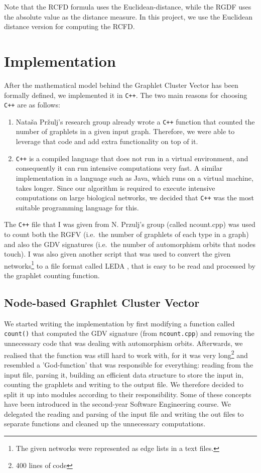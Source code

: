 Note that the RCFD formula uses the Euclidean-distance, while the RGDF uses the absolute value as the distance measure. In this project, we use the Euclidean distance version for computing the RCFD.

\section{Implementation}

After the mathematical model behind the Graphlet Cluster Vector has been formally defined, we implemented it in \verb!C++!. The two main reasons for choosing \verb!C++! are as follows:
\begin{enumerate}
 \item Nata\v{s}a Pr\v{z}ulj's research group already wrote a \verb!C++! function that counted the number of graphlets in a given input graph. Therefore, we were able to leverage that code and add extra functionality on top of it.
 \item \verb!C++! is a compiled language that does not run in a virtual
environment, and consequently it can run intensive computations very fast. A similar implementation in a language such as Java, which runs on a virtual machine, takes longer. Since our algorithm is required to execute intensive computations on large biological networks, we decided that \verb!C++! was the most suitable programming language for this.
\end{enumerate}

The \verb!C++! file that I was given from N. Przulj's group (called ncount.cpp) was used to count both the RGFV (i.e.\ the number of graphlets of each type in a graph) and also the GDV signatures (i.e.\ the number of automorphism orbits that nodes touch). I was also given another script that was used to convert the given networks\footnote{The given networks were represented as edge lists in a text files.} to a file format called LEDA \cite{leda2014fileformat}, that is easy to be read and processed by the graphlet counting function.

\subsection{Node-based Graphlet Cluster Vector}

We started writing the implementation by first modifying a function called \lstinline|count()| that computed the GDV signature (from \lstinline|ncount.cpp|) and removing the unnecessary code that was dealing with
automorphism orbits. Afterwards, we realised that the function was still hard to
work with, for it was very long\footnote{400 lines of code} and resembled a 'God-function' that was responsible for everything: reading from the input file, parsing it, building an efficient data structure to store the input in, counting the graphlets and writing to the output file. We therefore decided to split it up into modules according to their responsibility. Some of these concepts have been introduced in the
second-year Software Engineering course. We delegated the reading and parsing of the input file and writing the out files to separate functions and cleaned up the unnecessary computations.

